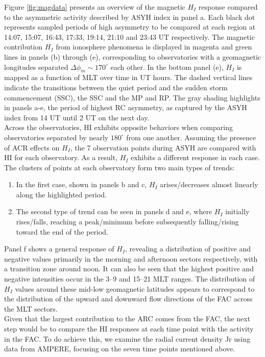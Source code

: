 \documentclass[a4paper]{article}
\theoremstyle{plain}
\theoremstyle{definition}
\begin{document}
	
	Figure \ref{fig:magdata} presents an overview of the magnetic $H_I$ response compared to the asymmetric activity described by ASYH index in panel a. Each black dot represents sampled periods of high asymmetry to be compared at each region at 14:07, 15:07, 16:43, 17:33, 19:14, 21:10 and 23:43 UT respectively. The magnetic contribution $H_I$ from ionosphere phenomena is displayed in magenta and green lines in panels (b) through (e), corresponding to observatories with a geomagnetic longitudes separated $\Delta \phi_m \sim 170^\circ$ each other. In the bottom panel (e), $H_I$ is mapped as a function of MLT over time in UT hours. The dashed vertical lines indicate the transitions between the quiet period and the sudden storm commencement (SSC), the SSC and the MP and RP. The gray shading highlights in panels a-e, the period of highest RC asymmetry, as captured by the ASYH index  from 14 UT until 2 UT on the next day.\\
	
	Across the observatories, HI exhibits opposite behaviors when comparing observatories separated by nearly $180^\circ$ from one another. Assuming the presence of ACR effects on $H_I$, the 7 observation points during ASYH are compared with HI for each observatory. As a result, $H_I$ exhibits a different response in each case. The clusters of points at each observatory form two main types of trends:
	
	\begin{enumerate}
		\item In the first case, shown in panels b and c, $H_I$ arises/decreases almost linearly along the highlighted period. 
		\item The second type of trend can be seen in panels d and e, where $H_I$ initially rises/falls, reaching a peak/minimum before subsequently falling/rising toward the end of the period. 
	\end{enumerate}
	
	Panel f shows a general response of $H_I$, revealing a distribution of positive and negative values primarily in the morning and afternoon sectors respectively, with a transition zone around noon. It can also be seen that the highest positive and negative intensities occur in the 3–9 and 15–21 MLT ranges. The distribution of $H_I$ values around these mid-low geomagnetic latitudes appears to correspond to the distribution of the upward and downward flow directions of the FAC across the MLT sectors.\\ 
	
	Given that the largest contribution to the ARC comes from the FAC, the next step would be to compare the HI responses at each time point with the activity in the FAC. To do achieve this, we examine the radial current density Jr using data from AMPERE, focusing on the seven time points mentioned above.\\
	
\end{document}
